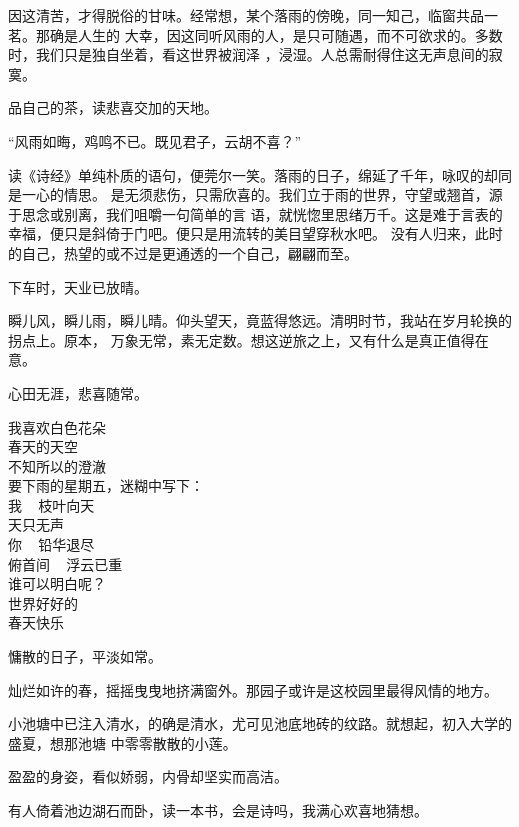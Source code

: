 \documentclass[12pt,a4paper]{article}
\begin{document}
		因这清苦，才得脱俗的甘味。经常想，某个落雨的傍晚，同一知己，临窗共品一茗。那确是人生的
	大幸，因这同听风雨的人，是只可随遇，而不可欲求的。多数时，我们只是独自坐着，看这世界被润泽
	，浸湿。人总需耐得住这无声息间的寂寞。

		品自己的茶，读悲喜交加的天地。

		“风雨如晦，鸡鸣不已。既见君子，云胡不喜？”

		读《诗经》单纯朴质的语句，便莞尔一笑。落雨的日子，绵延了千年，咏叹的却同是一心的情思。
	是无须悲伤，只需欣喜的。我们立于雨的世界，守望或翘首，源于思念或别离，我们咀嚼一句简单的言
	语，就恍惚里思绪万千。这是难于言表的幸福，便只是斜倚于门吧。便只是用流转的美目望穿秋水吧。
	没有人归来，此时的自己，热望的或不过是更通透的一个自己，翩翩而至。

		下车时，天业已放晴。

		瞬儿风，瞬儿雨，瞬儿晴。仰头望天，竟蓝得悠远。清明时节，我站在岁月轮换的拐点上。原本，
	万象无常，素无定数。想这逆旅之上，又有什么是真正值得在意。

		心田无涯，悲喜随常。

	\endwriting



		\longpoem{}{}{}
		我喜欢白色花朵 \\
		春天的天空 \\
		不知所以的澄澈 \\
		要下雨的星期五，迷糊中写下：\\
		我 ~ 枝叶向天 \\
		天只无声 \\
		你 ~ 铅华退尽 \\
		俯首间 ~ 浮云已重 \\
		谁可以明白呢？ \\
		世界好好的 \\
		春天快乐
		\endlongpoem

	\endwriting




		慵散的日子，平淡如常。

		灿烂如许的春，摇摇曳曳地挤满窗外。那园子或许是这校园里最得风情的地方。

		小池塘中已注入清水，的确是清水，尤可见池底地砖的纹路。就想起，初入大学的盛夏，想那池塘
	中零零散散的小莲。

		盈盈的身姿，看似娇弱，内骨却坚实而高洁。

		有人倚着池边湖石而卧，读一本书，会是诗吗，我满心欢喜地猜想。
\end{document}

